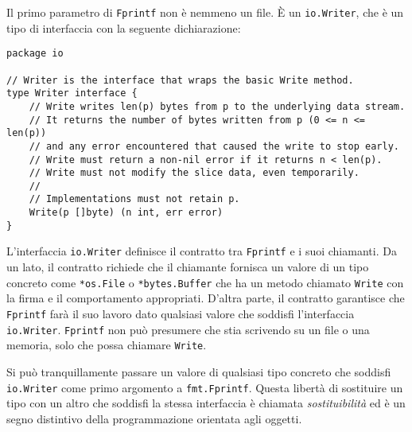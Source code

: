 \documentclass[../../thesis.tex]{subfiles}
\begin{document}
    Il primo parametro di \verb"Fprintf" non è nemmeno un file.
    È un \verb"io.Writer", che è un tipo di interfaccia con la seguente dichiarazione:
    \newpage\noindent
    \begin{lstlisting}[frame = single,label={lst:lstlisting6-1.2}]
package io

// Writer is the interface that wraps the basic Write method.
type Writer interface {
    // Write writes len(p) bytes from p to the underlying data stream.
    // It returns the number of bytes written from p (0 <= n <= len(p))
    // and any error encountered that caused the write to stop early.
    // Write must return a non-nil error if it returns n < len(p).
    // Write must not modify the slice data, even temporarily.
    //
    // Implementations must not retain p.
    Write(p []byte) (n int, err error)
}
    \end{lstlisting}
    L'interfaccia \verb"io.Writer" definisce il contratto tra \verb"Fprintf" e i suoi chiamanti.
    Da un lato, il contratto richiede che il chiamante fornisca un valore di un tipo concreto come \verb"*os.File" o \verb"*bytes.Buffer" che ha un metodo chiamato \verb"Write" con la firma e il comportamento appropriati.
    D'altra parte, il contratto garantisce che \verb"Fprintf" farà il suo lavoro dato qualsiasi valore che soddisfi l'interfaccia \verb"io.Writer". \verb"Fprintf" non può presumere che stia scrivendo su un file o una memoria, solo che possa chiamare \verb"Write".
    \hfill \vspace{12pt}

    Si può tranquillamente passare un valore di qualsiasi tipo concreto che soddisfi \verb"io.Writer" come primo argomento a \verb"fmt.Fprintf".
    Questa libertà di sostituire un tipo con un altro che soddisfi la stessa interfaccia è chiamata \textit{sostituibilità} ed è un segno distintivo della programmazione orientata agli oggetti.
    \hfill \vspace{12pt}
\end{document}
